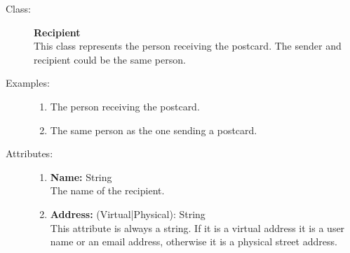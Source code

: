 \documentclass[10pt,a4paper]{article}
\begin{document}
\begin{description}
\item[Class:] \textbf{Recipient} \hfill \\
This class represents the person receiving the postcard. The sender and recipient could be the same person.

\item[Examples:] \hfill
\begin{enumerate}
\item The person receiving the postcard.
\item The same person as the one sending a postcard.
\end{enumerate}

\item[Attributes:] \hfill
\begin{enumerate}
\item \textbf{Name:} String \hfill \\The name of the recipient. 
\item \textbf{Address:} (Virtual|Physical): String \hfill \\This attribute is always a string. If it is a virtual address it is a user name or an email address, otherwise it is a physical street address.
\end{enumerate}
 
\end{description}

\hrulefill
\end{document}
